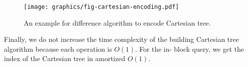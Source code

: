 

\begin{figure*}[!thb]
  \centering
  \texttt{[image: graphics/fig-cartesian-encoding.pdf]}

  \caption{An example for difference algorithm to encode Cartesian tree.}

  \label{fig:cartesianEncoding}
\end{figure*}

Finally, we do not increase the time complexity of the building
Cartesian tree algorithm because each operation is $O(1)$.  For the in-
block query, we get the index of the Cartesian tree in amortized $O(1)$.

\iffalse
最後，我們不改變原本的建立笛卡爾樹算法，便能在過程中擭得樹的編號，
每一次的 in-block 詢問只需要一次記憶體存取，得到任一操作攤銷複雜度 $\theta(1)$。
\fi
